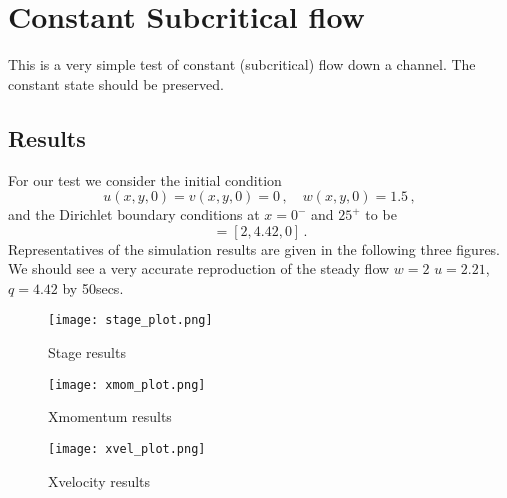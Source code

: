 
\section{Constant Subcritical flow}

This is a very simple test of constant (subcritical) flow down a channel. The constant state should be preserved. 


\subsection{Results}
For our test we consider the initial condition
\begin{equation}
u(x,y,0)=v(x,y,0)=0\,, \quad
w(x,y,0)= 1.5\,,
\end{equation}
and the Dirichlet boundary conditions at $x=0^{-}$ and $25^{+}$ to be 
\begin{equation}
[w,hu,hv]=[2, 4.42, 0]\,.
\end{equation}
Representatives of the simulation results are given in the following three figures. 
We should see a very accurate reproduction of the steady flow $w=2$ $u=2.21$, $q=4.42$ by 50secs. 

\begin{figure}
\begin{center}
\texttt{[image: stage\_plot.png]}
\end{center}
\caption{Stage results}
\end{figure}


\begin{figure}
\begin{center}
\texttt{[image: xmom\_plot.png]}
\end{center}
\caption{Xmomentum results}
\end{figure}


\begin{figure}
\begin{center}
\texttt{[image: xvel\_plot.png]}
\end{center}
\caption{Xvelocity results}
\end{figure}


\endinput
